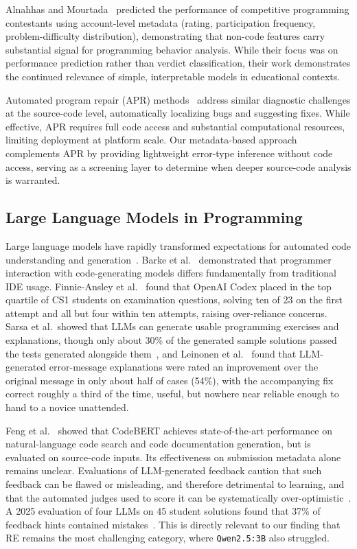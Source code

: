 \documentclass[acmsmall]{acmart}
\begin{document}
Alnahhas and Mourtada~\cite{alnahhas2020predicting} predicted the
performance of competitive programming contestants using account-level
metadata (rating, participation frequency, problem-difficulty distribution),
demonstrating that non-code features carry substantial signal for programming
behavior analysis. While their focus was on performance prediction rather than
verdict classification, their work demonstrates the continued relevance of simple,
interpretable models
in educational contexts.

Automated program repair (APR) methods~\cite{monperrus2018automatic} address similar diagnostic challenges at the source-code level, automatically localizing bugs and suggesting fixes. While effective, APR requires full code access and substantial computational resources, limiting deployment at platform scale. Our metadata-based approach complements APR by providing lightweight error-type inference without code access, serving as a screening layer to determine when deeper source-code analysis is warranted.

\subsection{Large Language Models in Programming}

Large language models have rapidly transformed expectations for automated code
understanding and generation~\cite{barke2023grounded,becker2023programming}. Barke et al.~\cite{barke2023grounded} demonstrated that programmer interaction with code-generating models differs fundamentally from traditional IDE usage. Finnie-Ansley et al.~\cite{finnie2022robots} found that OpenAI Codex placed in the
top quartile of CS1 students on examination questions, solving ten of 23 on the
first attempt and all but four within ten attempts, raising over-reliance concerns. Sarsa et al.\ showed that LLMs can generate usable programming exercises and
explanations, though only about 30\% of the generated sample solutions passed
the tests generated alongside them~\cite{sarsa2022automatic}, and Leinonen et al.~\cite{leinonen2023llm} found that LLM-generated
error-message explanations were rated an improvement over the original message
in only about half of cases (54\%), with the accompanying fix correct roughly a
third of the time, useful, but nowhere near reliable enough to hand to a novice
unattended.

Feng et al.~\cite{feng2020codebert} showed that CodeBERT achieves state-of-the-art performance on natural-language code search and code documentation generation, but is evaluated on source-code inputs. Its effectiveness on submission metadata alone remains unclear. Evaluations of
LLM-generated feedback caution that such feedback can be flawed or
misleading, and therefore detrimental to learning, and that the automated
judges used to score it can be systematically over-optimistic~\cite{koutcheme2024opensource}. A 2025 evaluation of four LLMs on 45 student solutions found that 37\% of feedback hints contained mistakes~\cite{silva2025assessing}. This is directly relevant to our finding that RE remains the most challenging category, where \texttt{Qwen2.5:3B} also struggled.
\end{document}
